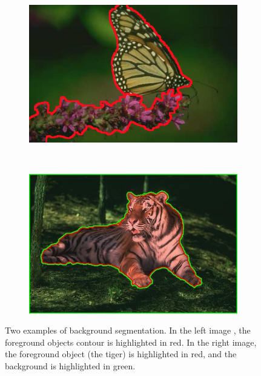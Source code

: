 \begin{figure}[htbp]
	\centering
    \begin{subfigure}[l]{0.49\textwidth}
        \centering
    	\includegraphics[width=\textwidth]
    	{figures/Background-segmentation-01.png}
        \end{subfigure}
        ~
        \begin{subfigure}[r]{0.49\textwidth}
	        \centering
    		\includegraphics[width=\textwidth]
    		{figures/Background-segmentation-02.jpg}
		\end{subfigure} 
    \caption[dummy]{Two examples of background segmentation. In the left image \cite{ren2013image}, the foreground objects contour is highlighted in red. In the right image\cite{nieuwenhuis-cremers-pami12_2}, the foreground object (the tiger) is highlighted in red, and the background is highlighted in green.}
    \label{fig:generic_garment_segmentation}
\end{figure}


